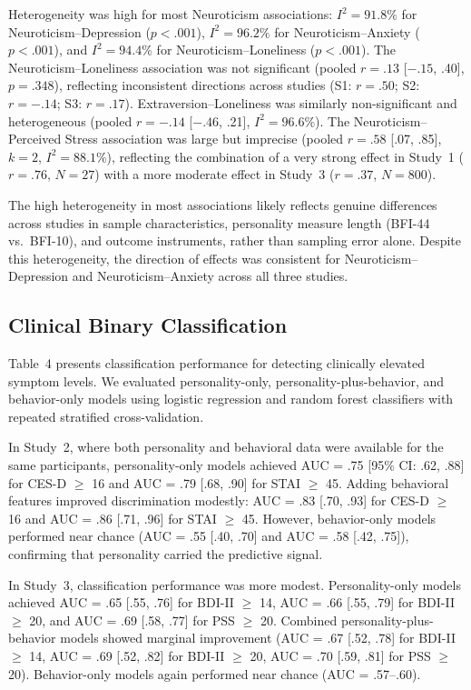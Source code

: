 \documentclass[12pt, a4paper]{article}
\begin{document}
Heterogeneity was high for most Neuroticism associations: $I^2 = 91.8\%$ for Neuroticism--Depression ($p < .001$), $I^2 = 96.2\%$ for Neuroticism--Anxiety ($p < .001$), and $I^2 = 94.4\%$ for Neuroticism--Loneliness ($p < .001$). The Neuroticism--Loneliness association was not significant (pooled $r = .13$ [${-.15}$, .40], $p = .348$), reflecting inconsistent directions across studies (S1: $r = .50$; S2: $r = -.14$; S3: $r = .17$). Extraversion--Loneliness was similarly non-significant and heterogeneous (pooled $r = -.14$ [${-.46}$, .21], $I^2 = 96.6\%$). The Neuroticism--Perceived Stress association was large but imprecise (pooled $r = .58$ [.07, .85], $k = 2$, $I^2 = 88.1\%$), reflecting the combination of a very strong effect in Study~1 ($r = .76$, $N = 27$) with a more moderate effect in Study~3 ($r = .37$, $N = 800$).

The high heterogeneity in most associations likely reflects genuine differences across studies in sample characteristics, personality measure length (BFI-44 vs.\ BFI-10), and outcome instruments, rather than sampling error alone. Despite this heterogeneity, the direction of effects was consistent for Neuroticism--Depression and Neuroticism--Anxiety across all three studies.

\subsection{Clinical Binary Classification}

Table~4 presents classification performance for detecting clinically elevated symptom levels. We evaluated personality-only, personality-plus-behavior, and behavior-only models using logistic regression and random forest classifiers with repeated stratified cross-validation.

In Study~2, where both personality and behavioral data were available for the same participants, personality-only models achieved AUC = .75 [95\% CI: .62, .88] for CES-D $\geq$ 16 and AUC = .79 [.68, .90] for STAI $\geq$ 45. Adding behavioral features improved discrimination modestly: AUC = .83 [.70, .93] for CES-D $\geq$ 16 and AUC = .86 [.71, .96] for STAI $\geq$ 45. However, behavior-only models performed near chance (AUC = .55 [.40, .70] and AUC = .58 [.42, .75]), confirming that personality carried the predictive signal.

In Study~3, classification performance was more modest. Personality-only models achieved AUC = .65 [.55, .76] for BDI-II $\geq$ 14, AUC = .66 [.55, .79] for BDI-II $\geq$ 20, and AUC = .69 [.58, .77] for PSS $\geq$ 20. Combined personality-plus-behavior models showed marginal improvement (AUC = .67 [.52, .78] for BDI-II $\geq$ 14, AUC = .69 [.52, .82] for BDI-II $\geq$ 20, AUC = .70 [.59, .81] for PSS $\geq$ 20). Behavior-only models again performed near chance (AUC = .57--$.60$).
\end{document}
